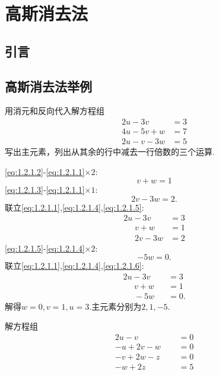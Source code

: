 ﻿\documentclass{book} \usepackage{exsheets} \usepackage{xeCJK}
\begin{document}
\chapter{高斯消去法}
\section{引言}
\section{高斯消去法举例}
\begin{question}
  用消元和反向代入解方程组
  \begin{align}
    2u-3v~~~~~~&=3\tag{1}\label{eq:1.2.1.1}\\
    4u-5v+w&=7\tag{2}\label{eq:1.2.1.2}\\
2u-v-3w&=5\tag{3}\label{eq:1.2.1.3}
  \end{align}
写出主元素，列出从其余的行中减去一行倍数的三个运算.
\end{question}
\begin{solution}
  \eqref{eq:1.2.1.2}-\eqref{eq:1.2.1.1}$\times 2$:
  \begin{equation}\tag{4}
    \label{eq:1.2.1.4}
    v+w=1
  \end{equation}
\eqref{eq:1.2.1.3}-\eqref{eq:1.2.1.1}$\times 1$:
\begin{equation}\tag{5}
  \label{eq:1.2.1.5}
  2v-3w=2.
\end{equation}
联立\eqref{eq:1.2.1.1},\eqref{eq:1.2.1.4},\eqref{eq:1.2.1.5}:
\begin{align*}
  2u-3v~~~~~~&=3\\
~~~~~~v+w&=1\\
~~~~~~2v-3w&=2
\end{align*}
\eqref{eq:1.2.1.5}-\eqref{eq:1.2.1.4}$\times 2$:
\begin{equation}\tag{6}
  \label{eq:1.2.1.6}
  -5w=0.
\end{equation}
联立\eqref{eq:1.2.1.1},\eqref{eq:1.2.1.4},\eqref{eq:1.2.1.6}:
\begin{align*}
  2u-3v~~~~~~&=3\\
~~~~~~v+w&=1\\
~~~~~~-5w&=0.
\end{align*}
解得$w=0,v=1,u=3$.主元素分别为$2,1,-5$.
\end{solution}
\begin{question}
  解方程组
  \begin{align}
    2u-v~~~~~~~~~~~~&=0\tag{1}\label{eq:1.2.2.1}\\
-u+2v-w~~~~~~&=0\tag{2}\label{eq:1.2.2.2}\\
-v+2w-z&=0\tag{3}\label{eq:1.2.2.3}\\
-w+2z&=5\tag{4}\label{eq:1.2.2.4}
  \end{align}
\end{question}
\end{document}
